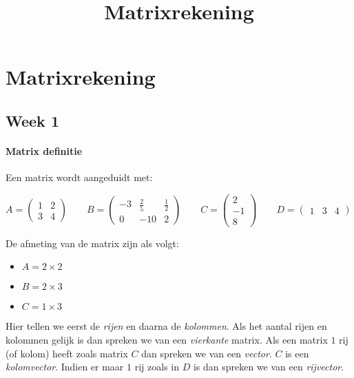 \documentclass[11pt]{article}
\title{Matrixrekening}
\providecommand{\tightlist}{%
      \setlength{\itemsep}{0pt}\setlength{\parskip}{0pt}}
\begin{document}
    
    
    \maketitle
    
    

    
    \hypertarget{matrixrekening}{%
\section{Matrixrekening}\label{matrixrekening}}

    \hypertarget{week-1}{%
\subsection{Week 1}\label{week-1}}

    \hypertarget{matrix-definitie}{%
\paragraph{Matrix definitie}\label{matrix-definitie}}

    Een matrix wordt aangeduidt met:

    \(A = \begin{pmatrix} 1 & 2 \\ 3 & 4 \end{pmatrix} \qquad B = \begin{pmatrix} -3 & \frac{2}{5} & \frac{1}{2} \\ 0 & -10 & 2 \end{pmatrix} \qquad C = \begin{pmatrix} 2 \\ -1 \\ 8 \end{pmatrix} \qquad D = \begin{pmatrix}1 & 3 & 4 \end{pmatrix}\)

    De afmeting van de matrix zijn als volgt:

\begin{itemize}
\tightlist
\item
  \(A = 2 \times 2\)
\item
  \(B = 2 \times 3\)
\item
  \(C = 1 \times 3\)
\end{itemize}

Hier tellen we eerst de \emph{rijen} en daarna de \emph{kolommen}. Als
het aantal rijen en kolommen gelijk is dan spreken we van een
\emph{vierkante} matrix. Als een matrix \(1\) rij (of kolom) heeft zoals
matrix \(C\) dan spreken we van een \emph{vector}. \(C\) is een
\emph{kolomvector}. Indien er maar \(1\) rij zoals in \(D\) is dan
spreken we van een \emph{rijvector}.
\end{document}
